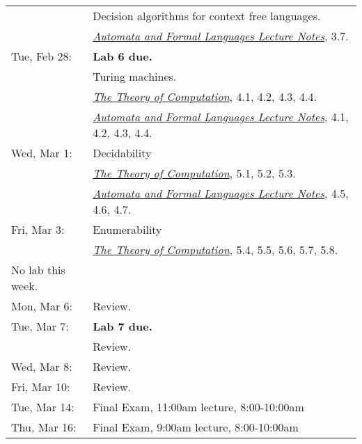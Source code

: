 \documentclass{article}
\newcommand{\theory}
           {\href{http://cg.scs.carleton.ca/~michiel/TheoryOfComputation/}
             {{\em The Theory of Computation}}}
\newcommand{\automata}
           {\href{http://users.utu.fi/jkari/automata/}
             {{\em Automata and Formal Languages Lecture Notes}}}
\begin{document}
\begin{longtable}{ll}
\\& Decision algorithms for context free languages. \\&\automata, 3.7.
\\
Tue, Feb 28:
& {\bf Lab 6 due.}
\\& Turing machines.
\\& \theory, 4.1, 4.2, 4.3, 4.4.
\\& \automata, 4.1, 4.2, 4.3, 4.4.
\\
Wed, Mar 1:
& Decidability
\\& \theory, 5.1, 5.2, 5.3.
\\& \automata, 4.5, 4.6, 4.7.
\\
Fri, Mar 3:
& Enumerability
\\&\theory, 5.4, 5.5, 5.6, 5.7, 5.8.
\\\hline
No lab this week.
\\
Mon, Mar 6:& Review.
\\
Tue, Mar 7:& {\bf Lab 7 due.}
\\& Review.
\\
Wed, Mar 8:&  Review.
\\
Fri, Mar 10: & Review.
\\\hline
Tue, Mar 14: &  Final Exam, 11:00am lecture, 8:00-10:00am
\\
Thu, Mar 16: &  Final Exam, 9:00am lecture, 8:00-10:00am
\end{longtable}
\end{document}
